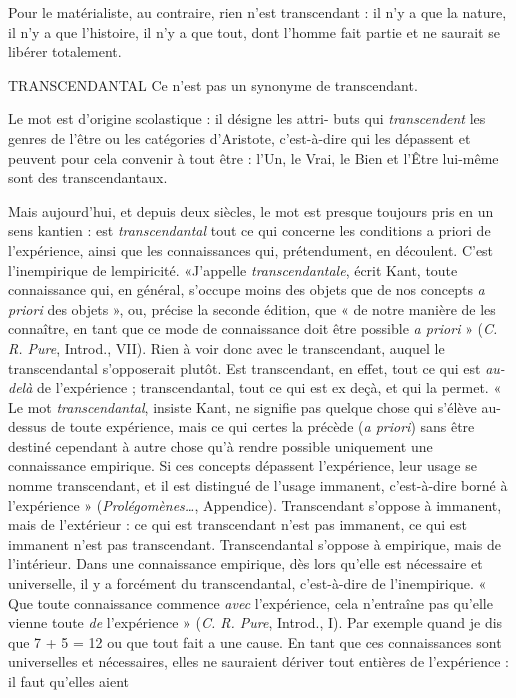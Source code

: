 Pour le matérialiste, au contraire, rien n’est transcendant : il n’y a que la
nature, il n’y a que l’histoire, il n’y a que tout, dont l’homme fait partie et ne
saurait se libérer totalement.

TRANSCENDANTAL Ce n’est pas un synonyme de transcendant.

Le mot est d’origine scolastique : il désigne les attri-
buts qui {\it transcendent} les genres de l’être ou les catégories d’Aristote, c’est-à-dire
qui les dépassent et peuvent pour cela convenir à tout être : l’Un, le Vrai, le
Bien et l’Être lui-même sont des transcendantaux.

Mais aujourd’hui, et depuis deux siècles, le mot est presque toujours pris en
un sens kantien : est {\it transcendantal} tout ce qui concerne les conditions a priori de
l'expérience, ainsi que les connaissances qui, prétendument, en découlent. C’est
l’inempirique de lempiricité. «J'appelle {\it transcendantale}, écrit Kant, toute
connaissance qui, en général, s’occupe moins des objets que de nos concepts {\it a
priori} des objets », ou, précise la seconde édition, que « de notre manière de les
connaître, en tant que ce mode de connaissance doit être possible {\it a priori} »
({\it C. R. Pure}, Introd., VII). Rien à voir donc avec le transcendant, auquel le transcendantal
s’opposerait plutôt. Est transcendant, en effet, tout ce qui est {\it au-delà}
de l’expérience ; transcendantal, tout ce qui est ex deçà, et qui la permet. « Le mot
{\it transcendantal}, insiste Kant, ne signifie pas quelque chose qui s’élève au-dessus de
toute expérience, mais ce qui certes la précède ({\it a priori}) sans être destiné cependant
à autre chose qu’à rendre possible uniquement une connaissance empirique.
Si ces concepts dépassent l’expérience, leur usage se nomme transcendant, et il est
distingué de l’usage immanent, c’est-à-dire borné à l’expérience » ({\it Prolégomènes…},
Appendice). Transcendant s'oppose à immanent, mais de l’extérieur :
ce qui est transcendant n’est pas immanent, ce qui est immanent n’est pas transcendant.
Transcendantal s'oppose à empirique, mais de l’intérieur. Dans une
connaissance empirique, dès lors qu’elle est nécessaire et universelle, il y a forcément
du transcendantal, c’est-à-dire de l’inempirique. « Que toute connaissance
commence {\it avec} l'expérience, cela n’entraîne pas qu’elle vienne toute {\it de}
l'expérience » ({\it C. R. Pure}, Introd., I). Par exemple quand je dis que 7 + 5 = 12 ou
que tout fait a une cause. En tant que ces connaissances sont universelles et nécessaires,
elles ne sauraient dériver tout entières de l’expérience : il faut qu’elles aient
